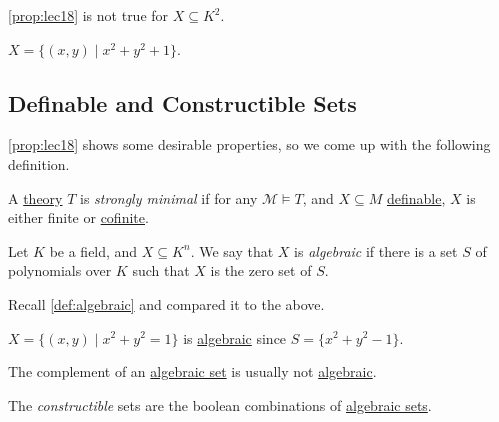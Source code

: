\begin{remark}
	\autoref{prop:lec18} is not true for \(X \subseteq K^2\).
\end{remark}
\begin{explanation}
	\(X = \{ (x, y) \mid x^2 + y^2 + 1 \} \).
\end{explanation}

\subsection{Definable and Constructible Sets}
\autoref{prop:lec18} shows some desirable properties, so we come up with the following definition.

\begin{definition}\label{def:strongly-minimal}
	A \hyperref[def:theory]{theory} \(T\) is \emph{strongly minimal} if for any \(\mathcal{M} \models T\), and \(X \subseteq M\) \hyperref[def:definable]{definable}, \(X\) is either finite or \hyperref[def:cofinite]{cofinite}.
\end{definition}

\begin{definition}[Algebraic]\label{def:algebraic-set}
	Let \(K\) be a field, and \(X \subseteq K^n\). We say that \(X\) is \emph{algebraic} if there is a set \(S\) of polynomials over \(K\) such that \(X\) is the zero set of \(S\).
\end{definition}

\begin{prev}
	Recall \autoref{def:algebraic} and compared it to the above.
\end{prev}

\begin{eg}
	\(X = \{(x, y) \mid x^2 + y^2 = 1\}\) is \hyperref[def:algebraic]{algebraic} since \(S = \{ x^2 + y^2 -1 \} \).
\end{eg}

The complement of an \hyperref[def:algebraic-set]{algebraic set} is usually not \hyperref[def:algebraic-set]{algebraic}.

\begin{definition}[Constructible]\label{def:constructible}
	The \emph{constructible} sets are the boolean combinations of \hyperref[def:algebraic-set]{algebraic sets}.
\end{definition}

